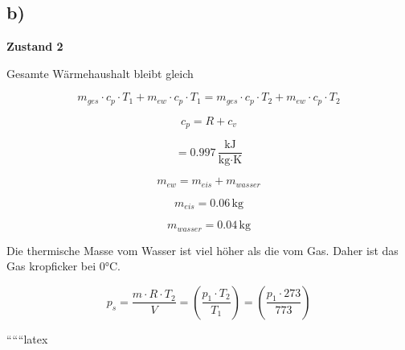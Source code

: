

\subsection*{b)}

\textbf{Zustand 2}

Gesamte Wärmehaushalt bleibt gleich

\[
m_{ges} \cdot c_{p} \cdot T_1 + m_{ew} \cdot c_p \cdot T_1 = m_{ges} \cdot c_p \cdot T_2 + m_{ew} \cdot c_p \cdot T_2
\]

\[
c_p = R + c_v
\]

\[
= 0.997 \, \frac{\text{kJ}}{\text{kg} \cdot \text{K}}
\]

\[
m_{ew} = m_{eis} + m_{wasser}
\]

\[
m_{eis} = 0.06 \, \text{kg}
\]

\[
m_{wasser} = 0.04 \, \text{kg}
\]

Die thermische Masse vom Wasser ist viel höher als die vom Gas. Daher ist das Gas kropficker bei 0°C.

\[
p_s = \frac{m \cdot R \cdot T_2}{V} = \left( \frac{p_1 \cdot T_2}{T_1} \right) = \left( \frac{p_1 \cdot 273}{773} \right)
\]

``````latex